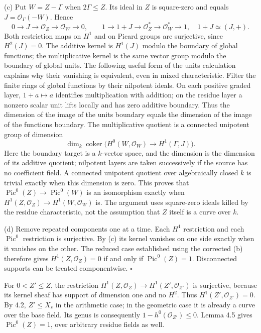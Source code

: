 \documentclass[11pt]{article}
\let\chapterexercise\exercise
\renewcommand{\exercise}[2]{\Needspace{8\baselineskip}\chapterexercise{#1}{#2}}
\begin{document}
(c) Put $W=Z-\Gamma$ when $2\Gamma\le Z$. Its ideal in $Z$ is square-zero and equals $J=\mathcal O_\Gamma(-W)$. Hence
\[ 0\to J\to\mathcal O_Z\to\mathcal O_W\to0,\qquad
1\to1+J\to\mathcal O_Z^*\to\mathcal O_W^*\to1,\quad 1+J\simeq(J,+). \]
Both restriction maps on $H^1$ and on Picard groups are surjective, since $H^2(J)=0$. The additive kernel is $H^1(J)$ modulo the boundary of global functions; the multiplicative kernel is the same vector group modulo the boundary of global units. The following useful form of the units calculation explains why their vanishing is equivalent, even in mixed characteristic. Filter the finite rings of global functions by their nilpotent ideals. On each positive graded layer, $1+a\mapsto a$ identifies multiplication with addition; on the residue layer a nonzero scalar unit lifts locally and has zero additive boundary. Thus the dimension of the image of the units boundary equals the dimension of the image of the functions boundary. The multiplicative quotient is a connected unipotent group of dimension
\[ \dim_k\operatorname{coker}\bigl(H^0(W,\mathcal O_W)\to H^1(\Gamma,J)\bigr). \]
Here the boundary target is a $k$-vector space, and the dimension is the dimension of its additive quotient; nilpotent layers are taken successively if the source has no coefficient field. A connected unipotent quotient over algebraically closed $k$ is trivial exactly when this dimension is zero. This proves that $\operatorname{Pic}^0(Z)\to\operatorname{Pic}^0(W)$ is an isomorphism exactly when $H^1(Z,\mathcal O_Z)\to H^1(W,\mathcal O_W)$ is. The argument uses square-zero ideals killed by the residue characteristic, not the assumption that $Z$ itself is a curve over $k$.

(d) Remove repeated components one at a time. Each $H^1$ restriction and each $\operatorname{Pic}^0$ restriction is surjective. By (c) its kernel vanishes on one side exactly when it vanishes on the other. The reduced case established using the corrected (b) therefore gives $H^1(Z,\mathcal O_Z)=0$ if and only if $\operatorname{Pic}^0(Z)=1$. Disconnected supports can be treated componentwise. \hfill$\square$

\pf For $0<Z'\le Z$, the restriction $H^1(Z,\mathcal O_Z)\to H^1(Z',\mathcal O_{Z'})$ is surjective, because its kernel sheaf has support of dimension one and no $H^2$. Thus $H^1(Z',\mathcal O_{Z'})=0$. By 4.2, $Z'\le X_s$ in the arithmetic case; in the geometric case it is already a curve over the base field. Its genus is consequently $1-h^0(\mathcal O_{Z'})\le0$. Lemma 4.5 gives $\operatorname{Pic}^0(Z)=1$, over arbitrary residue fields as well.
\end{document}
